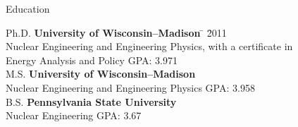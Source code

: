 \documentclass{resume2} %
\begin{document}

\begin{rSection}{Education}

\begin{tabbing}
Ph.D. \hspace*{2 em}\= \textbf{University of Wisconsin--Madison} \hspace*{5em} \= \hspace*{15em} \= 2011 \\
      \> Nuclear Engineering and Engineering Physics, with a certificate in \\ \> Energy Analysis and Policy \> GPA: 3.971\\
%
M.S. \hspace*{2 em}\> \textbf{University of Wisconsin--Madison} \>  \\
      \> Nuclear Engineering and Engineering Physics \> GPA: 3.958\\
%
B.S. \hspace*{2 em}\> \textbf{Pennsylvania State University} \>  \\
      \> Nuclear Engineering \> GPA: 3.67\\
\end{tabbing}

\end{rSection}

\end{document}
